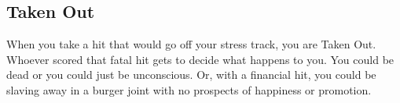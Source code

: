 \subsection{Taken Out}\label{sec:Taken Out} %

When you take a hit that would go off your stress track, you are Taken Out. Whoever scored that fatal hit gets to decide what happens to you. You could be dead or you could just be unconscious. Or, with a financial hit, you could be slaving away in a burger joint with no prospects of happiness or promotion.

